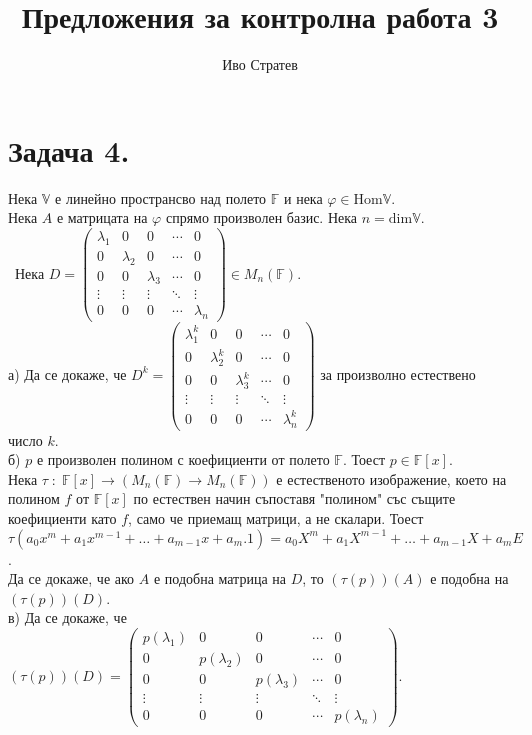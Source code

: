 \documentclass[a4paper, 12pt, oneside]{article}
\title{Предложения за контролна работа 3}
\author{Иво Стратев}
\begin{document}
\maketitle
\section*{Задача 4.}
Нека \(\mathbb{V}\) е линейно пространсво над полето \(\mathbb{F}\)
и нека \(\varphi \in \mathrm{Hom}\mathbb{V}\). \\
Нека \(A\) е матрицата на \(\varphi\) спрямо произволен базис.
Нека \(n = \mathrm{dim}\mathbb{V}\).\\\
Нека \(D = \begin{pmatrix}
    \lambda_1 & 0 & 0 & \cdots & 0 \\
    0 & \lambda_2 & 0 & \cdots & 0 \\
    0 & 0 & \lambda_3 & \cdots & 0 \\
    \vdots & \vdots & \vdots & \ddots & \vdots \\
    0 & 0 & 0 & \cdots & \lambda_n
\end{pmatrix} \in M_n(\mathbb{F})\). \\
а) Да се докаже, че \(D^k = \begin{pmatrix}
    \lambda_1^k & 0 & 0 & \cdots & 0 \\
    0 & \lambda_2^k & 0 & \cdots & 0 \\
    0 & 0 & \lambda_3^k & \cdots & 0 \\
    \vdots & \vdots & \vdots & \ddots & \vdots \\
    0 & 0 & 0 & \cdots & \lambda_n^k
\end{pmatrix}\) за произволно естествено число \(k\). \\
б) \(p\) е произволен полином с коефициенти от полето \(\mathbb{F}\).
Тоест \(p \in \mathbb{F}[x]\). \\
Нека \(\tau \; : \; \mathbb{F}[x] \to (M_n(\mathbb{F}) \to M_n(\mathbb{F}))\)
е естественото изображение, което на полином \(f\) от \(\mathbb{F}[x]\)
по естествен начин съпоставя "полином" със същите коефициенти като \(f\),
само че приемащ матрици, а не скалари. Тоест \\
\(\tau( a_0x^m + a_1 x^{m - 1} + \dots + a_{m - 1}x + a_m.1 ) = a_0X^m + a_1 X^{m - 1} + \dots + a_{m - 1}X + a_m E \). \\
Да се докаже, че ако \(A\) е подобна матрица на \(D\),
то  \((\tau(p))(A)\) е подобна на \((\tau(p))(D)\). \\
в) Да се докаже, че \((\tau(p))(D) = \begin{pmatrix}
    p(\lambda_1) & 0 & 0 & \cdots & 0 \\
    0 & p(\lambda_2) & 0 & \cdots & 0 \\
    0 & 0 & p(\lambda_3) & \cdots & 0 \\
    \vdots & \vdots & \vdots & \ddots & \vdots \\
    0 & 0 & 0 & \cdots & p(\lambda_n)
\end{pmatrix} \). \\
\end{document}
